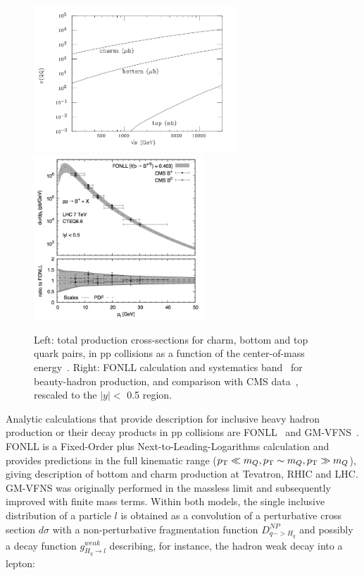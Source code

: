 \begin{figure}[!ht]
  \centering
  \includegraphics[width=7.6cm]{FigCap2/HQxsecPPcoll.png}
      \includegraphics[width=6.4cm]{FigCap2/FONLLBmeson.png}
  \caption{Left: total production cross-sections for charm, bottom and top quark pairs, in pp collisions as a function of the center-of-mass energy~\cite{Mangano:1997ri}. Right: FONLL calculation and systematics band~\cite{Cacciari:2012ny} for beauty-hadron production, and comparison with CMS data~\cite{Khachatryan:2011mk,Chatrchyan:2011pw}, rescaled to the $|y| <$ 0.5 region.}
  \label{fig:HQxsecPPcoll}
\end{figure}
Analytic calculations that provide description for inclusive heavy hadron production or their decay products
in pp collisions are FONLL~\cite{Cacciari:1998it,Cacciari:2001td} and GM-VFNS~\cite{Kniehl:2004fy}. 
FONLL is a Fixed-Order plus Next-to-Leading-Logarithms 
calculation and provides predictions in the full kinematic range ($p_{\rm T} \ll m_Q, p_{\rm T} \sim m_Q, p_{\rm T} \gg m_Q$),
giving description of bottom and charm production at Tevatron, RHIC and LHC. 
GM-VFNS was originally performed in the massless limit and subsequently improved with finite mass terms.
Within both models, the single inclusive distribution of a particle $l$ is obtained as a convolution of a
perturbative cross section $d\sigma$ with a non-perturbative fragmentation function $D^{NP}_{q->H_q}$
and possibly a decay function $g^{weak}_{H_q \rightarrow l}$ describing, for instance, the hadron weak decay into a lepton:
